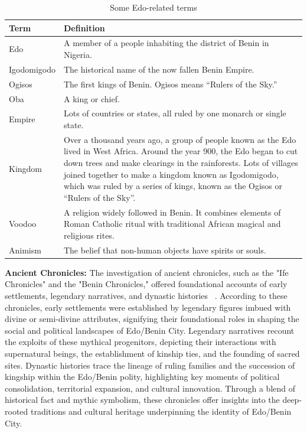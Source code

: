\begin{table}[htb]
\centering
\caption{Some Edo-related terms}
\label{tab:edo_vocab}
\begin{tabularx}{\linewidth}{|l|X|}
\hline
\textbf{Term} & \textbf{Definition} \\
\hline
Edo & A member of a people inhabiting the district of Benin in Nigeria. \\
\hline
Igodomigodo & The historical name of the now fallen Benin Empire. \\
\hline
Ogisos & The first kings of Benin. Ogisos means “Rulers of the Sky.” \\
\hline
Oba & A king or chief. \\
\hline
Empire & Lots of countries or states, all ruled by one monarch or single state. \\
\hline
Kingdom & Over a thousand years ago, a group of people known as the Edo lived in West Africa. Around the year 900, the Edo began to cut down trees and make clearings in the rainforests. Lots of villages joined together to make a kingdom known as Igodomigodo, which was ruled by a series of kings, known as the Ogisos or “Rulers of the Sky”. \\
\hline
Voodoo & A religion widely followed in Benin. It combines elements of Roman Catholic ritual with traditional African magical and religious rites. \\
\hline
Animism & The belief that non-human objects have spirits or souls. \\
\hline
\end{tabularx}
\end{table}

\vspace{0.5cm} 
\textbf{Ancient Chronicles:} The investigation of ancient chronicles, such as the "Ife Chronicles" and the "Benin Chronicles," offered foundational accounts of early settlements, legendary narratives, and dynastic histories ~\cite{otterbein1966}. According to these chronicles, early settlements were established by legendary figures imbued with divine or semi-divine attributes, signifying their foundational roles in shaping the social and political landscapes of Edo/Benin City. Legendary narratives recount the exploits of these mythical progenitors, depicting their interactions with supernatural beings, the establishment of kinship ties, and the founding of sacred sites. Dynastic histories trace the lineage of ruling families and the succession of kingship within the Edo/Benin polity, highlighting key moments of political consolidation, territorial expansion, and cultural innovation. Through a blend of historical fact and mythic symbolism, these chronicles offer insights into the deep-rooted traditions and cultural heritage underpinning the identity of Edo/Benin City.

